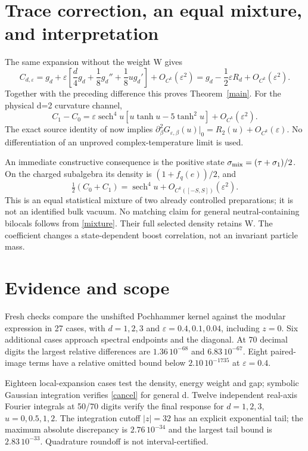 \documentclass[11pt]{article}
\newcommand{\eps}{\varepsilon}
\newcommand{\sech}{\operatorname{sech}}
\begin{document}
\newpage
\section{Trace correction, an equal mixture, and interpretation}
The same expansion without the weight W gives
\[
 C_{d,\eps}=g_d+\eps\left[\frac d4g_d+\frac18g_d''
                            +\frac18ug_d'\right]+O_{C^k}(\eps^2)
             =g_d-\frac12\eps R_d+O_{C^k}(\eps^2).
\]
Together with the preceding difference this proves Theorem~\ref{main}.
For the physical d=2 curvature channel,
\[
 C_1-C_0=\eps\sech^4u[u\tanh u-5\tanh^2u]+O_{C^k}(\eps^2).
\]
The exact source identity of \cite{response} now implies
$\partial_\beta^2G_{\eps,\beta}(u)|_0=R_2(u)+O_{C^k}(\eps)$.
No differentiation of an unproved complex-temperature limit is used.

An immediate constructive consequence is the positive state
$\sigma_{\rm mix}=(\tau+\sigma_1)/2$. On the charged subalgebra
its density is $(1+f_q(e))/2$, and
\begin{equation}\label{mixture}
 \tfrac12(C_0+C_1)=\sech^4u+O_{C^k([-S,S])}(\eps^2).
\end{equation}
This is an equal statistical mixture of two already controlled
preparations; it is not an identified bulk vacuum. No matching
claim for general neutral-containing bilocals follows from
\eqref{mixture}. Their full selected density retains W.
The coefficient changes a state-dependent boost correlation,
not an invariant particle mass.

\section{Evidence and scope}
Fresh checks compare the unshifted Pochhammer kernel against the
modular expression in 27 cases, with $d=1,2,3$ and
$\eps=0.4,0.1,0.04$, including $z=0$. Six additional cases
approach spectral endpoints and the diagonal. At 70 decimal digits
the largest relative differences are $1.36\,10^{-68}$ and
$6.83\,10^{-67}$. Eight paired-image terms have a relative omitted
bound below $2.10\,10^{-1735}$ at $\eps=0.4$.

Eighteen local-expansion cases test the density, energy weight and
gap; symbolic Gaussian integration verifies \eqref{cancel} for
general d. Twelve independent real-axis Fourier integrals at
50/70 digits verify the final response for $d=1,2,3$,
$u=0,0.5,1,2$. The integration cutoff $|z|=32$ has an explicit
exponential tail; the maximum absolute discrepancy is
$2.76\,10^{-34}$ and the largest tail bound is $2.83\,10^{-33}$.
Quadrature roundoff is not interval-certified.
\end{document}
